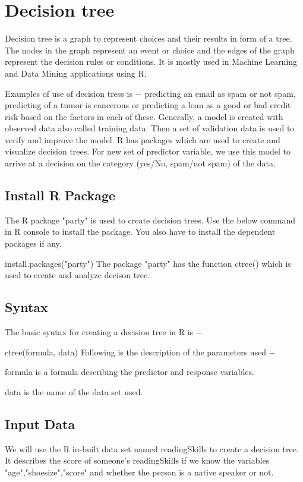 \documentclass[a4paper,12pt]{article}
\begin{document}
\section*{Decision tree}

Decision tree is a graph to represent choices and their results in form of a tree. The nodes in the graph represent an event or choice and the edges of the graph represent the decision rules or conditions. It is mostly used in Machine Learning and Data Mining applications using R.

Examples of use of decision tress is − predicting an email as spam or not spam, predicting of a tumor is cancerous or predicting a loan as a good or bad credit risk based on the factors in each of these. Generally, a model is created with observed data also called training data. Then a set of validation data is used to verify and improve the model. R has packages which are used to create and visualize decision trees. For new set of predictor variable, we use this model to arrive at a decision on the category (yes/No, spam/not spam) of the data.



\subsection*{Install R Package}
The R package "party" is used to create decision trees.
Use the below command in R console to install the package. 
You also have to install the dependent packages if any.

install.packages("party")
The package "party" has the function ctree() which is used to create and analyze decison tree.

\subsection*{Syntax}
The basic syntax for creating a decision tree in R is −

ctree(formula, data)
Following is the description of the parameters used −

formula is a formula describing the predictor and response variables.

data is the name of the data set used.

\subsection*{Input Data}
We will use the R in-built data set named readingSkills to create a decision tree. It describes the score of someone's readingSkills if we know the variables "age","shoesize","score" and whether the person is a native speaker or not.
\end{document}

